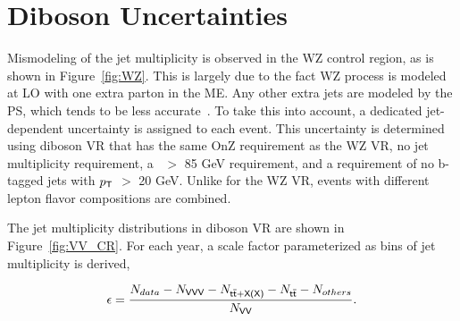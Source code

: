 \section{Diboson Uncertainties}
\label{sec:DiUnc}

Mismodeling of the jet multiplicity is observed in the WZ control region, as is shown in Figure~\ref{fig:WZ}. This is largely due to the fact WZ process is modeled at \ac{LO} with one extra parton in the \ac{ME}. Any other extra jets are modeled by the \ac{PS}, which tends to be less accurate~\cite{CMS:2018sgc,CMS:2020mpn}. To take this into account, a dedicated jet-dependent uncertainty is assigned to each event. This uncertainty is determined using diboson \ac{VR} that has the same OnZ requirement as the WZ \ac{VR}, no jet multiplicity requirement, a \MET~$>$ 85 GeV requirement, and a requirement of no b-tagged jets with $p_{\textsf{T}}$ $>$ 20 GeV. Unlike for the WZ \ac{VR}, events with different lepton flavor compositions are combined.

The jet multiplicity distributions in diboson \ac{VR} are shown in Figure~\ref{fig:VV_CR}. For each year, a scale factor parameterized as bins of jet multiplicity is derived,

\begin{equation}
\epsilon=\frac{N_{data}-N_{\textsf{VVV}}-N_{\textsf{t}\overline{\textsf{t}}+\textsf{X(X)}}-N_{\textsf{t}\overline{\textsf{t}}}-N_{others}}{N_{\textsf{VV}}}.
\end{equation}

